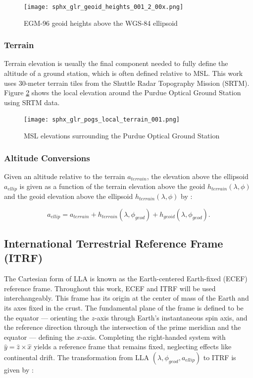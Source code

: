 \begin{figure}[ht]
  \centering
  \texttt{[image: sphx\_glr\_geoid\_heights\_001\_2\_00x.png]}
  \caption{EGM-96 geoid heights above the WGS-84 ellipsoid}
  \label{fig:geoid_shape}
\end{figure}

\subsubsection{Terrain}

Terrain elevation is usually the final component needed to fully define the altitude of a ground station, which is often defined relative to MSL. This work uses $30$-meter terrain tiles from the Shuttle Radar Topography Mission (SRTM). Figure \ref{fig:pogs_terrain} shows the local elevation around the Purdue Optical Ground Station using SRTM data.

\begin{figure}[ht]
  \centering
  \texttt{[image: sphx\_glr\_pogs\_local\_terrain\_001.png]}
  \caption{MSL elevations surrounding the Purdue Optical Ground Station}
  \label{fig:pogs_terrain}
\end{figure}

\subsubsection{Altitude Conversions}

Given an altitude relative to the terrain $a_{terrain}$, the elevation above the ellipsoid $a_{ellip}$ is given as a function of the terrain elevation above the geoid $h_{terrain}(\lambda, \phi)$ and the geoid elevation above the ellipsoid $h_{terrain}(\lambda, \phi)$ by \cite{vallado4ed}:

\begin{equation} \label{eq:altitude_above_ellipsoid}
  a_{ellip} = a_{terrain} + h_{terrain}(\lambda, \phi_{geod}) + h_{geoid}(\lambda, \phi_{geod}).
\end{equation}

\subsection{International Terrestrial Reference Frame (ITRF)}

The Cartesian form of LLA is known as the Earth-centered Earth-fixed (ECEF) reference frame. Throughout this work, ECEF and ITRF will be used interchangeably. This frame has its origin at the center of mass of the Earth and its axes fixed in the crust. The
fundamental plane of the frame is defined to be the equator ---  orienting the $z$-axis through Earth's
instantaneous spin axis, and the reference direction through the intersection of the prime meridian
and the equator ---  defining the $x$-axis. Completing the right-handed system with $\hat{y} = \hat{z} \times \hat{x}$ yields a
reference frame that remains fixed, neglecting effects like continental drift. The transformation from LLA $\left( \lambda, \phi_{geod}, a_{ellip} \right)$ to ITRF is given by \cite{vallado4ed}:

